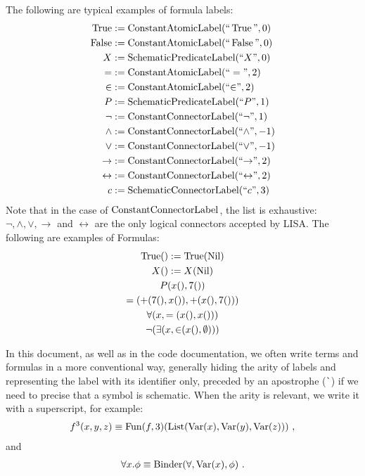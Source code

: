 \begin{example}[Formula]The following are typical examples of formula labels:
  \begin{align*}
    \operatorname{True}           & := \operatorname{ConstantAtomicLabel}(``\operatorname{True}", 0)             \\
    \operatorname{False}          & := \operatorname{ConstantAtomicLabel}(``\operatorname{False}", 0)            \\
    X               & := \operatorname{SchematicPredicateLabel}(``X", 0)                \\
    =               & := \operatorname{ConstantAtomicLabel}(``=", 2)                 \\
    {\in}           & := \operatorname{ConstantAtomicLabel}(``{\in}", 2)             \\
    P               & := \operatorname{SchematicPredicateLabel}(``P", 1)                \\
    \neg            & := \operatorname{ConstantConnectorLabel}(``{\neg}", 1)            \\
    \land           & := \operatorname{ConstantConnectorLabel}(``{\land}", -1)          \\
    \lor            & := \operatorname{ConstantConnectorLabel}(``{\lor}", -1)           \\
    \rightarrow     & := \operatorname{ConstantConnectorLabel}(``{\rightarrow}", 2)     \\
    \leftrightarrow & := \operatorname{ConstantConnectorLabel}(``{\leftrightarrow}", 2) \\
    c               & := \operatorname{SchematicConnectorLabel}(``{c}", 3)              \\
  \end{align*}
  Note that in the case of $\operatorname{ConstantConnectorLabel}$, the list is exhaustive: $\neg, \land, \lor, \rightarrow$ and $\leftrightarrow$ are the only logical connectors accepted by LISA.
  The following are examples of Formulas:
  \begin{gather*}
    \operatorname{True}() := \operatorname{True}(\operatorname{Nil})\\
    X() := X(\operatorname{Nil})\\
    P(x(), 7()) \\
    =(+(7(), x()), +(x(), 7()))\\
    \forall(x, =(x(), x())) \\
    \neg(\exists(x, {\in}(x(), \emptyset)))
  \end{gather*}
\end{example}

In this document, as well as in the code documentation, we often write terms and formulas in a more conventional way, generally hiding the arity of labels and representing the label with its identifier only, preceded by an apostrophe (\lstinline|`|) if we need to precise that a symbol is schematic. When the arity is relevant, we write it with a superscript, for example:
%
\begin{gather*}
  f^3(x,y,z) \equiv \operatorname{Fun}(f, 3)(\operatorname{List}(\operatorname{Var}(x), \operatorname{Var}(y), \operatorname{Var}(z)))~,
\end{gather*}
%
and
%
\begin{gather*}
  \forall x. \phi \equiv \operatorname{Binder}(\forall, \operatorname{Var}(x), \phi)~.
\end{gather*}

